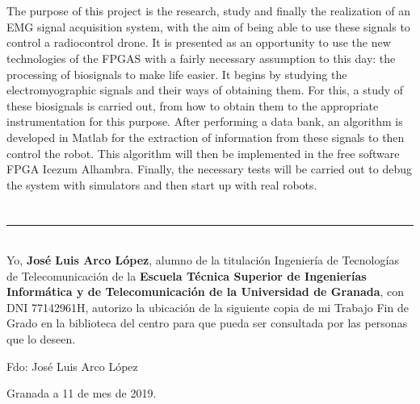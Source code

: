 \\

\vspace{0.7cm}
\\


The purpose of this project is the research, study and finally the realization of an EMG signal acquisition system, with the aim of being able to use these signals to control a radiocontrol drone. It is presented as an opportunity to use the new technologies of the FPGAS with a fairly necessary assumption to this day: the processing of biosignals to make life easier. It begins by studying the electromyographic signals and their ways of obtaining them. For this, a study of these biosignals is carried out, from how to obtain them to the appropriate instrumentation for this purpose. After performing a data bank, an algorithm is developed in Matlab for the extraction of information from these signals to then control the robot. This algorithm will then be implemented in the free software FPGA Icezum Alhambra. Finally, the necessary tests will be carried out to debug the system with simulators and then start up with real robots.
\cleardoublepage

\chapter*{}
\thispagestyle{empty}

\noindent\rule[-1ex]{\textwidth}{2pt}\\[4.5ex]

Yo, \textbf{José Luis Arco López}, alumno de la titulación Ingeniería de Tecnologías de Telecomunicación de la \textbf{Escuela Técnica Superior
de Ingenierías Informática y de Telecomunicación de la Universidad de Granada}, con DNI 77142961H, autorizo la
ubicación de la siguiente copia de mi Trabajo Fin de Grado en la biblioteca del centro para que pueda ser
consultada por las personas que lo deseen.

\vspace{6cm}

\noindent Fdo: José Luis Arco López

\vspace{2cm}

\begin{flushright}
Granada a 11 de mes de 2019.
\end{flushright}


